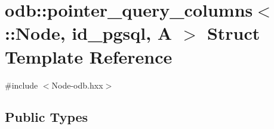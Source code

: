 \hypertarget{structodb_1_1pointer__query__columns_3_01_1_1_node_00_01id__pgsql_00_01_a_01_4}{}\section{odb\+:\+:pointer\+\_\+query\+\_\+columns$<$ \+:\+:Node, id\+\_\+pgsql, A $>$ Struct Template Reference}
\label{structodb_1_1pointer__query__columns_3_01_1_1_node_00_01id__pgsql_00_01_a_01_4}


{\ttfamily \#include $<$Node-\/odb.\+hxx$>$}

\subsection*{Public Types}

